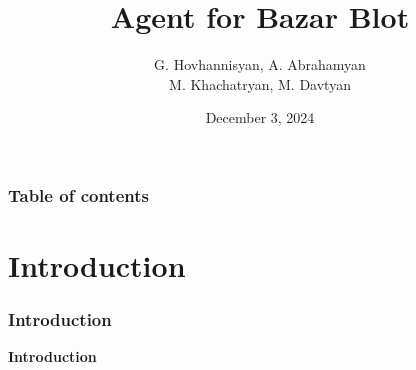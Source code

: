 \documentclass{beamer}
\begin{document}
\title{Agent for Bazar Blot}
\author{G. Hovhannisyan,  A. Abrahamyan\\
M. Khachatryan, M. Davtyan}
\date{December 3, 2024}


\begin{frame}
\titlepage
\end{frame}

\begin{frame}\frametitle{Table of contents}\tableofcontents
\end{frame}


\section{Introduction}
\begin{frame}\frametitle{Introduction}
    \begin{center}
        \textbf{Introduction}
    \end{center}
\end{frame}
\end{document}
